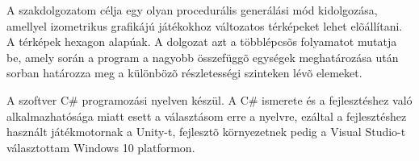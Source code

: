 
A szakdolgozatom célja egy olyan procedurális generálási mód kidolgozása, amellyel izometrikus grafikájú játékokhoz változatos térképeket lehet elõállítani. A térképek hexagon alapúak. A dolgozat azt a többlépcsõs folyamatot mutatja be, amely során a program a nagyobb összefüggõ egységek meghatározása után sorban határozza meg a különbözõ részletességi szinteken lévõ elemeket.

A szoftver C\# programozási nyelven készül. A C\# ismerete és a fejlesztéshez való alkalmazhatósága miatt esett a választásom erre a nyelvre, ezáltal a fejlesztéshez használt játékmotornak a Unity-t, fejlesztõ környezetnek pedig a Visual Studio-t választottam Windows 10 platformon.


